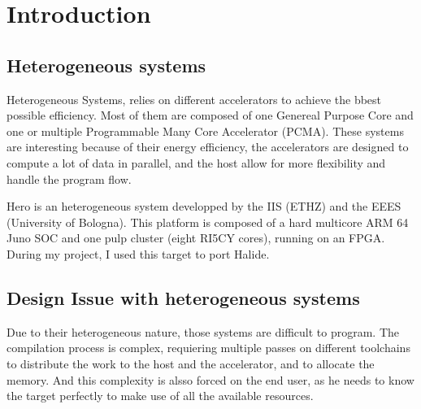 
\chapter{Introduction}

\section{Heterogeneous systems}
	Heterogeneous Systems, relies on different accelerators to achieve the bbest possible efficiency. Most of them are composed of one Genereal Purpose Core and one or multiple Programmable Many Core Accelerator (PCMA). These systems are interesting because of their energy efficiency, the accelerators are designed to compute a lot of data in parallel, and the host allow for more flexibility and handle the program flow.

	Hero is an heterogeneous system developped by the IIS (ETHZ) and the EEES (University of Bologna). This platform is composed of a hard multicore ARM 64 Juno SOC and one pulp cluster (eight RI5CY cores), running on an FPGA. During my project, I used this target to port Halide.

\section {Design Issue with heterogeneous systems}
		Due to their heterogeneous nature, those systems are difficult to program. The compilation process is complex, requiering multiple passes on different toolchains to distribute the work to the host and the accelerator, and to allocate the memory. And this complexity is alsso forced on the end user, as he needs to know the target perfectly to make use of all the available resources.

